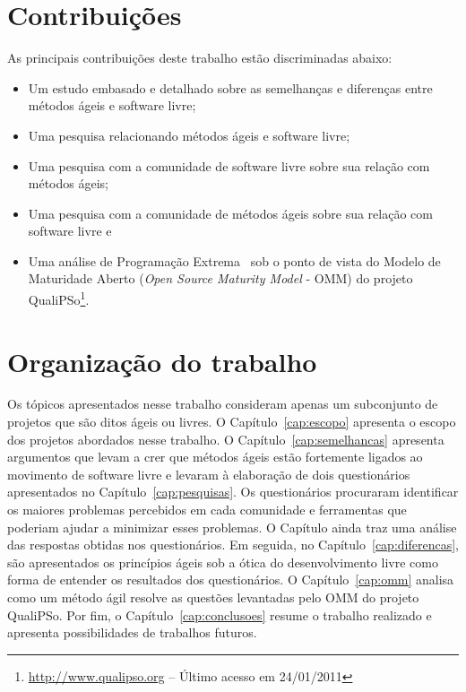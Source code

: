 \section{Contribuições}
\label{sec:contribucoes}

As principais contribuições deste trabalho estão discriminadas abaixo:

\begin{itemize}
\item Um estudo embasado e detalhado sobre as semelhanças e diferenças
  entre métodos ágeis e software livre;
\item Uma pesquisa relacionando métodos ágeis e software livre;
\item Uma pesquisa com a comunidade de software livre sobre sua
  relação com métodos ágeis;
\item Uma pesquisa com a comunidade de métodos ágeis sobre sua relação
  com software livre e
\item Uma análise de Programação Extrema~\cite{XP01} sob o ponto de
  vista do Modelo de Maturidade Aberto (\emph{Open Source Maturity
    Model} - OMM) do projeto
  QualiPSo\footnote{\url{http://www.qualipso.org} -- Último acesso em
    24/01/2011}.
\end{itemize}

\section{Organização do trabalho}
\label{sec:organizacao_trabalho}

Os tópicos apresentados nesse trabalho consideram apenas um
subconjunto de projetos que são ditos ágeis ou livres. O
Capítulo~\ref{cap:escopo} apresenta o escopo dos projetos abordados
nesse trabalho. O Capítulo~\ref{cap:semelhancas} apresenta argumentos
que levam a crer que métodos ágeis estão fortemente ligados ao
movimento de software livre e levaram à elaboração de dois
questionários apresentados no Capítulo~\ref{cap:pesquisas}. Os
questionários procuraram identificar os maiores problemas percebidos
em cada comunidade e ferramentas que poderiam ajudar a minimizar esses
problemas. O Capítulo ainda traz uma análise das respostas obtidas nos
questionários.  Em seguida, no Capítulo~\ref{cap:diferencas}, são
apresentados os princípios ágeis sob a ótica do desenvolvimento livre
como forma de entender os resultados dos questionários. O
Capítulo~\ref{cap:omm} analisa como um método ágil resolve as questões
levantadas pelo OMM do projeto QualiPSo.  Por fim, o
Capítulo~\ref{cap:conclusoes} resume o trabalho realizado e apresenta
possibilidades de trabalhos futuros.
